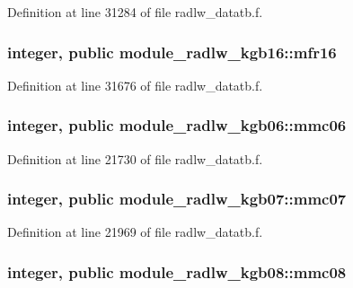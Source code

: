Definition at line 31284 of file radlw\+\_\+datatb.\+f.

\subsubsection[{\texorpdfstring{mfr16}{mfr16}}]{\setlength{\rightskip}{0pt plus 5cm}integer, public module\+\_\+radlw\+\_\+kgb16\+::mfr16}\hypertarget{group__module__radlw__main_ga82777667b951207c62955e3e1492d79d}{}\label{group__module__radlw__main_ga82777667b951207c62955e3e1492d79d}


Definition at line 31676 of file radlw\+\_\+datatb.\+f.

\subsubsection[{\texorpdfstring{mmc06}{mmc06}}]{\setlength{\rightskip}{0pt plus 5cm}integer, public module\+\_\+radlw\+\_\+kgb06\+::mmc06}\hypertarget{group__module__radlw__main_gaf7a377cb66fd48348789c20f5a31dec6}{}\label{group__module__radlw__main_gaf7a377cb66fd48348789c20f5a31dec6}


Definition at line 21730 of file radlw\+\_\+datatb.\+f.

\subsubsection[{\texorpdfstring{mmc07}{mmc07}}]{\setlength{\rightskip}{0pt plus 5cm}integer, public module\+\_\+radlw\+\_\+kgb07\+::mmc07}\hypertarget{group__module__radlw__main_ga2d176bec938d9fdcc2369fda91308702}{}\label{group__module__radlw__main_ga2d176bec938d9fdcc2369fda91308702}


Definition at line 21969 of file radlw\+\_\+datatb.\+f.

\subsubsection[{\texorpdfstring{mmc08}{mmc08}}]{\setlength{\rightskip}{0pt plus 5cm}integer, public module\+\_\+radlw\+\_\+kgb08\+::mmc08}\hypertarget{group__module__radlw__main_ga9e3bfc1880221c18fa07817eb62bcc47}{}\label{group__module__radlw__main_ga9e3bfc1880221c18fa07817eb62bcc47}



